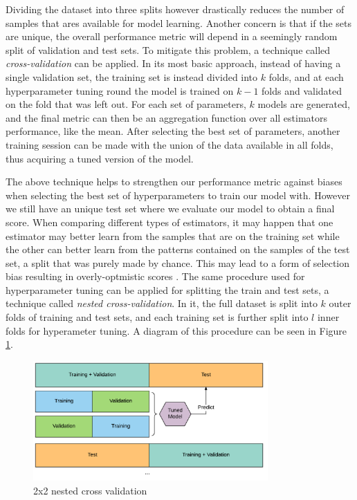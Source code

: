 \documentclass{kththesis}
\begin{document}
Dividing the dataset into three splits however drastically reduces the number of samples that ares available for model learning. Another concern is that if the sets are unique, the overall performance metric will depend in a seemingly random split of validation and test sets. To mitigate this problem, a technique called \emph{cross-validation} can be applied\citep{stone1974cross}. In its most basic approach, instead of having a single validation set, the training set is instead divided into $k$ folds, and at each hyperparameter tuning round the model is trained on $k-1$ folds and validated on the fold that was left out. For each set of parameters, $k$ models are generated, and the final metric can then be an aggregation function over all estimators performance, like the mean. After selecting the best set of parameters, another training session can be made with the union of the data available in all folds, thus acquiring a tuned version of the model.

The above technique helps to strengthen our performance metric against biases when selecting the best set of hyperparameters to train our model with. However we still have an unique test set where we evaluate our model to obtain a final score. When comparing different types of estimators, it may happen that one estimator may better learn from the samples that are on the training set while the other can better learn from the patterns contained on the samples of the test set, a split that was purely made by chance. This may lead to a form of selection bias resulting in overly-optmistic scores \citep{cawley2010over}. The same procedure used for hyperparameter tuning can be applied for splitting the train and test sets, a technique called \emph{nested cross-validation}. In it, the full dataset is split into $k$ outer folds of training and test sets, and each training set is further split into $l$ inner folds for hyperameter tuning.  A diagram of this procedure can be seen in Figure \ref{fig:crossval}.

	\begin{figure}[h]
    \centering
    \includegraphics[width=0.8\textwidth,keepaspectratio]{figures/crossval.pdf}
    \caption{2x2 nested cross validation}
    \label{fig:crossval}
	\end{figure}
\end{document}
